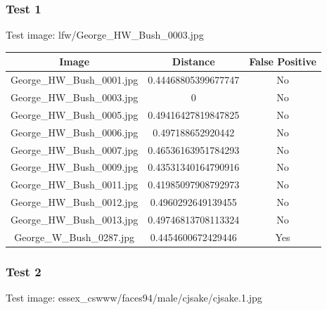 \documentclass[12pt]{article}
\begin{document}
\subsubsection{Test 1}
Test image: lfw/George\_HW\_Bush\_0003.jpg

\begin{center}
\begin{tabular}{ccc}
Image & Distance & False Positive \\
\hline
George\_HW\_Bush\_0001.jpg & 0.44468805399677747 & No \\
George\_HW\_Bush\_0003.jpg & 0 & No \\
George\_HW\_Bush\_0005.jpg & 0.49416427819847825 & No \\
George\_HW\_Bush\_0006.jpg & 0.497188652920442 & No \\
George\_HW\_Bush\_0007.jpg & 0.46536163951784293 & No \\
George\_HW\_Bush\_0009.jpg & 0.43531340164790916 & No \\
George\_HW\_Bush\_0011.jpg & 0.41985097908792973 & No \\
George\_HW\_Bush\_0012.jpg & 0.4960292649139455 & No \\
George\_HW\_Bush\_0013.jpg & 0.49746813708113324 & No \\
George\_W\_Bush\_0287.jpg & 0.4454600672429446 & Yes \\
\end{tabular}
\end{center}

\subsubsection{Test 2}
Test image: essex\_cswww/faces94/male/cjsake/cjsake.1.jpg
\end{document}
